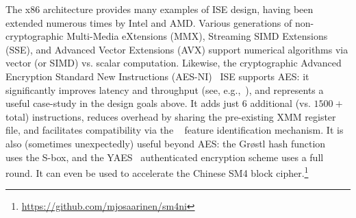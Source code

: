 \noindent
The x86 architecture provides many examples of ISE design,
having been extended numerous times by Intel and AMD.
Various generations of
non-cryptographic
Multi-Media      eXtensions (MMX),
Streaming SIMD  Extensions (SSE),
and
Advanced Vector Extensions (AVX)
support numerical algorithms via vector (or SIMD) vs. scalar computation.  
Likewise, the
    cryptographic
Advanced Encryption Standard New Instructions (AES-NI)~\cite{Gueron:09,DruGueKra:19}
ISE
supports AES: it significantly improves latency and throughput
(see, e.g.,~\cite{FazLopOli:18}),
and represents a useful case-study in the design goals above.
It adds just $6$ additional (vs. $1500+$ total) instructions,
reduces overhead by sharing the pre-existing XMM register file,
and facilitates compatibility via the
~\cite[Chapter 20]{X86:1:18}
feature identification mechanism.
It is also (sometimes unexpectedly) useful beyond AES:
the Gr{\o}stl hash function ~\cite{GKMMRST:11} uses the S-box,
and
the YAES~\cite{BosVer:14} authenticated encryption scheme uses a full round.
It can even be used to accelerate the Chinese SM4 block cipher.\footnote{\url{https://github.com/mjosaarinen/sm4ni}}


